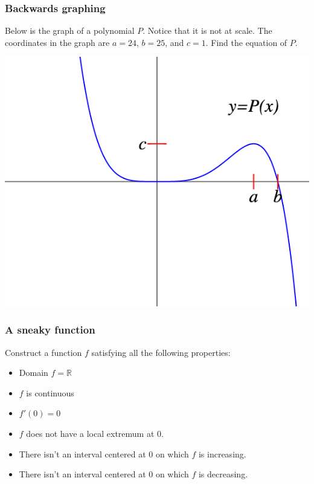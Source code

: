 \documentclass[14pt]{beamer}
\begin{document}
	\begin{frame}[t]
		\frametitle{Backwards graphing}

		Below is the graph of a polynomial $P$. Notice that it is not at scale. The
		coordinates in the graph are $a=24$, $b=25$, and $c=1$. Find the equation of
		$P$.

		\begin{center}
			\includegraphics[scale=.38]{G18}
		\end{center}
	\end{frame}


	\begin{frame}[t]
		\frametitle{A sneaky function}

		Construct a function $f$ satisfying all the following properties:

		\begin{itemize}
			\item Domain $\displaystyle f = \mathbb{R}$

			\item $f$ is continuous

			\item $f'(0)=0$

			\item $f$ does not have a local extremum at $0$.

			\item There isn't an interval centered at $0$ on which $f$ is increasing.

			\item There isn't an interval centered at $0$ on which $f$ is decreasing.
		\end{itemize}
	\end{frame}


\end{document}
